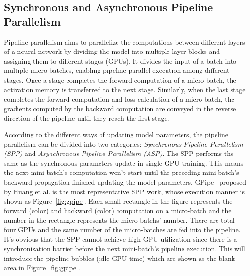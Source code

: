 \subsection{Synchronous and Asynchronous Pipeline Parallelism}
Pipeline parallelism aims to parallelize the computations between
different layers of a neural network by dividing the model into
multiple layer blocks and assigning them to different stages (GPUs).
It divides the input of a batch
into multiple micro-batches, enabling pipeline parallel execution among different stages.
Once a stage completes the forward computation of a micro-batch,
the activation memory is transferred to the next stage.
Similarly, when the last stage completes the forward computation
and loss calculation of a micro-batch,
the gradients computed by the backward computation are conveyed 
in the reverse direction of the pipeline until they reach the first stage.

According to the different ways of updating model parameters,
the pipeline parallelism can be divided into two categories:
\emph{Synchronous Pipeline Parallelism (SPP)} and \emph{Asynchronous Pipeline Parallelism (ASP)}.
The SPP performs the same as the synchronous
parameters update in single GPU training.
This means the next mini-batch's computation won't start until
the preceding mini-batch's backward propagation finished updating the model parameters.
GPipe~\cite{huangGpipeEfficientTraining2019} proposed by Huang et al.
is the most representative SPP work,
whose execution manner is shown as Figure~\ref{fig:gpipe}.
Each small rectangle in the figure represents the forward (color)
and backward (color) computation on a micro-batch
and the number in the rectangle represents the micro-batchs' number.
There are total four GPUs and the same number of the micro-batches are fed into the pipeline.
It's obvious that the SPP cannot achieve high GPU utilization
since there is a synchronization barrier before the next mini-batch's pipeline execution.
This will introduce the pipeline bubbles (idle GPU time)
which are shown as the blank area in Figure~\ref{fig:gpipe}.

